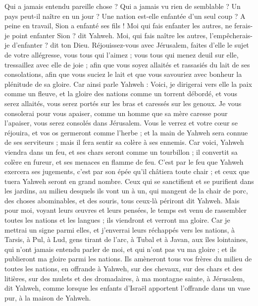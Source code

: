 \begin{multicols}{2}
Qui a jamais entendu pareille chose ? Qui a jamais vu rien de semblable ? Un pays peut-il naître en un jour ? Une nation est-elle enfantée d'un seul coup ? A peine en travail, Sion a enfanté ses fils !
Moi qui fais enfanter les autres, ne ferais-je point enfanter Sion ? dit Yahweh. Moi, qui fais naître les autres, l'empêcherais-je d'enfanter ? dit ton Dieu.
Réjouissez-vous avec Jérusalem, faites d'elle le sujet de votre allégresse, vous tous qui l'aimez ; vous tous qui menez deuil sur elle, tressaillez avec elle de joie ;
afin que vous soyez allaités et rassasiés du lait de ses consolations, afin que vous suciez le lait et que vous savouriez avec bonheur la plénitude de sa gloire.
Car ainsi parle Yahweh : Voici, je dirigerai vers elle la paix comme un fleuve, et la gloire des nations comme un torrent débordé, et vous serez allaités, vous serez portés sur les bras et caressés sur les genoux.
Je vous consolerai pour vous apaiser, comme un homme que sa mère caresse pour l'apaiser, vous serez consolés dans Jérusalem.
Vous le verrez et votre cœur se réjouira, et vos os germeront comme l'herbe ; et la main de Yahweh sera connue de ses serviteurs ; mais il fera sentir sa colère à ses ennemis.
Car voici, Yahweh viendra dans un feu, et ses chars seront comme un tourbillon ; il convertit sa colère en fureur, et ses menaces en flamme de feu.
C'est par le feu que Yahweh exercera ses jugements, c'est par son épée qu'il châtiera toute chair ; et ceux que tuera Yahweh seront en grand nombre.
Ceux qui se sanctifient et se purifient dans les jardins, au milieu desquels ils vont un à un, qui mangent de la chair de porc, des choses abominables, et des souris, tous ceux-là périront dit Yahweh.
Mais pour moi, voyant leurs œuvres et leurs pensées, le temps est venu de rassembler toutes les nations et les langues ; ils viendront et verront ma gloire.
Car je mettrai un signe parmi elles, et j'enverrai leurs réchappés vers les nations, à Tarsis, à Pul, à Lud, gens tirant de l'arc, à Tubal et à Javan, aux îles lointaines, qui n'ont jamais entendu parler de moi, et qui n'ont pas vu ma gloire ; et ils publieront ma gloire parmi les nations.
Ils amèneront tous vos frères du milieu de toutes les nations, en offrande à Yahweh, sur des chevaux, sur des chars et des litières, sur des mulets et des dromadaires, à ma montagne sainte, à Jérusalem, dit Yahweh, comme lorsque les enfants d'Israël apportent l'offrande dans un vase pur, à la maison de Yahweh.

\end{multicols}
